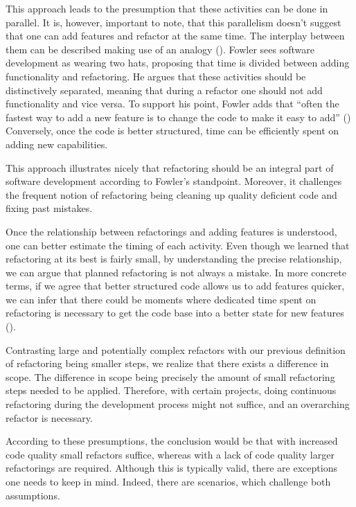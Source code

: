 This approach leads to the presumption that these activities can be done in parallel.
It is, however, important to note, 
	that this parallelism doesn't suggest that one can add features and refactor at the same time.
The interplay between them can be described making use of an analogy (\cite[p.~47]{fowler2018}). 
Fowler sees software development as wearing two hats, 
	proposing that time is divided between adding functionality and refactoring. 
He argues that these activities should be distinctively separated, 
	meaning that during a refactor one should not add functionality and vice versa. 
To support his point, 
	Fowler adds that “often the fastest way to add a new feature is to change the code to make it easy to add” (\cite[p.~53]{fowler2018}) 
Conversely, once the code is better structured, 
	time can be efficiently spent on adding new capabilities.

This approach illustrates nicely that refactoring 
	should be an integral part of software development according to Fowler's standpoint.  
Moreover, it challenges the frequent notion of refactoring being 
	cleaning up quality deficient code and fixing past mistakes. 

Once the relationship between refactorings and adding features is understood, 
	one can better estimate the timing of each activity.
Even though we learned that refactoring at its best is fairly small, 
	by understanding the precise relationship, 
	we can argue that planned refactoring is not always a mistake.
In more concrete terms, if we agree that better structured code 
	allows us to add features quicker, 
	we can infer that there could be moments where dedicated time spent on refactoring 
	is necessary to get the code base into a better state for new features (\cite[p.~53]{fowler2018}).

Contrasting large and potentially complex refactors with our previous definition of 
	refactoring being smaller steps, we realize 
	that there exists a difference in scope.
The difference in scope being precisely 
	the amount of small refactoring steps needed to be applied.
Therefore, with certain projects, doing continuous refactoring during the development process might not suffice, 
	and an overarching refactor is necessary.

According to these presumptions, the conclusion would be 
	that with increased code quality small refactors suffice, 
	whereas with a lack of code quality larger refactorings are required. 
Although this is typically valid, there are exceptions one needs to keep in mind. 
Indeed, there are scenarios, which challenge both assumptions.

